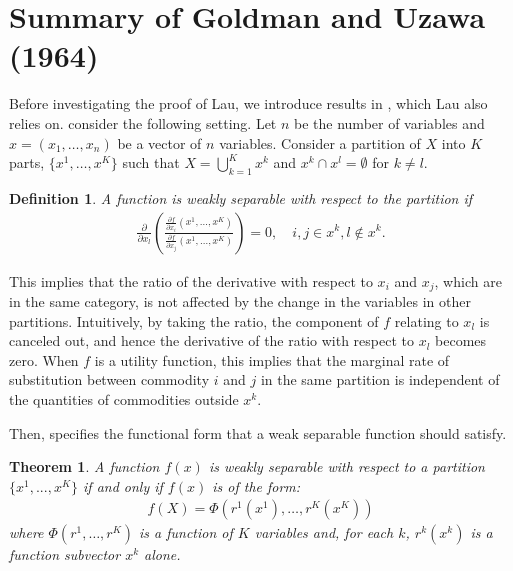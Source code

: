 \documentclass[11pt, a4paper]{article}
\newtheorem{theorem}{Theorem}
\newtheorem{definition}{Definition}
\theoremstyle{remark}
\begin{document}
\section{Summary of Goldman and Uzawa (1964)} \label{app:summary_of_goldman_and_uzawa}
Before investigating the proof of Lau, we introduce results in \citet{goldmanNote1964}, which Lau also relies on.
\citet{goldmanNote1964} consider the following setting.
Let $n$ be the number of variables and $x = (x_{1},\ldots, x_{n})$ be a vector of $n$ variables.
Consider a partition of $X$ into $K$ parts, $\{x^1, \ldots, x^K\}$ such that $X = \bigcup_{k=1}^K x^k$ and $x^k \cap x^l = \emptyset$ for $k\ne l$.
\begin{framed}
    \begin{definition}\label{def:weal_separable}
        A function is weakly separable with respect to the partition if 
        \begin{align}
            \frac{\partial}{\partial x_l}\left(\frac{\frac{\partial f}{\partial x_i}(x^1, \ldots, x^K)}{\frac{\partial f}{\partial x_j}(x^1, \ldots, x^K)}\right) = 0, \quad i,j\in x^k, l \notin x^k.
        \end{align}
    \end{definition}
\end{framed}
This implies that the ratio of the derivative with respect to $x_i$ and $x_j$, which are in the same category, is not affected by the change in the variables in other partitions.
Intuitively, by taking the ratio, the component of $f$ relating to $x_l$ is canceled out, and hence the derivative of the ratio with respect to $x_l$ becomes zero.
When $f$ is a utility function, this implies that the marginal rate of substitution between commodity $i$ and $j$ in the same partition is independent of the quantities of commodities outside $x^k$.

Then, \citet{goldmanNote1964} specifies the functional form that a weak separable function should satisfy.
\begin{framed}
    \begin{theorem}\label{thorem_2_GU}
    A function $f(x)$ is weakly separable with respect to a partition $\{x^1, .. ., x^K\}$ if and only if $f(x)$ is of the form: 
    \begin{align}
        f(X) = \Phi(r^1(x^{1}),\ldots, r^K(x^{K})   )
    \end{align} where $\Phi(r^1,\ldots, r^K)$ is a function of $K$ variables and, for each $k$, $r^k(x^{k})$ is a function subvector $x^{k}$ alone.
    \end{theorem}
\end{framed}
\end{document}
